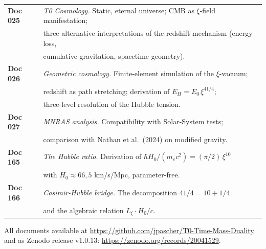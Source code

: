 \documentclass[11pt,a4paper]{article}
\begin{document}
\noindent\small\begin{tabular}{ll}
\textbf{Doc 025} & \emph{T0 Cosmology.} Static, eternal universe; CMB as $\xi$-field manifestation; \\
& three alternative interpretations of the redshift mechanism (energy loss, \\
& cumulative gravitation, spacetime geometry). \\[2pt]
\textbf{Doc 026} & \emph{Geometric cosmology.} Finite-element simulation of the $\xi$-vacuum; \\
& redshift as path stretching; derivation of $E_H = E_0\,\xi^{41/4}$; \\
& three-level resolution of the Hubble tension. \\[2pt]
\textbf{Doc 027} & \emph{MNRAS analysis.} Compatibility with Solar-System tests; \\
& comparison with Nathan et al.\ (2024) on modified gravity. \\[2pt]
\textbf{Doc 165} & \emph{The Hubble ratio.} Derivation of $\hbar H_0/(m_e c^2) = (\pi/2)\,\xi^{10}$ \\
& with $H_0 \approx 66{,}5$ km/s/Mpc, parameter-free. \\[2pt]
\textbf{Doc 166} & \emph{Casimir-Hubble bridge.} The decomposition $41/4 = 10 + 1/4$ \\
& and the algebraic relation $L_\xi \cdot H_0/c$. \\
\end{tabular}

\medskip
All documents available at \url{https://github.com/jpascher/T0-Time-Mass-Duality}\\
and as Zenodo release v1.0.13: \url{https://zenodo.org/records/20041529}.
\end{document}
